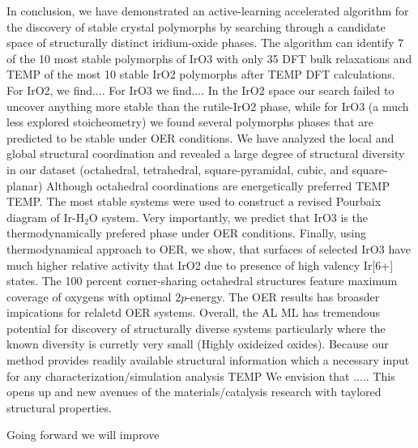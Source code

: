 

%

In conclusion, we have demonstrated an active-learning accelerated algorithm for the discovery of stable crystal polymorphs by searching through a candidate space of structurally distinct iridium-oxide phases.
The algorithm can identify 7 of the 10 most stable polymorphs of IrO3 with only 35 DFT bulk relaxations and TEMP of the most 10 stable IrO2 polymorphs after TEMP DFT calculations.
% 
For IrO2, we find....  For IrO3 we find.... 
In the IrO2 space our search failed to uncover anything more stable than the rutile-IrO2 phase,
while for IrO3 (a much less explored stoicheometry) we found several polymorphs phases that are predicted to be stable under OER conditions.
We have analyzed the local and global structural coordination and revealed a large degree of structural diversity in our dataset (octahedral, tetrahedral, square-pyramidal, cubic, and square-planar)
Although octahedral coordinations are energetically preferred TEMP TEMP.
%
The most stable systems were used to construct a revised Pourbaix diagram of Ir-H$_2$O system.
%
Very importantly, we predict that IrO3 is the thermodynamically prefered phase under OER conditions.
%
Finally, using thermodynamical approach to OER, we show, 
that surfaces of selected IrO3 have much higher relative activity that IrO2 due to presence of high valency Ir[6+] states.
%
The 100 percent corner-sharing octahedral structures feature maximum coverage of oxygens with optimal $2p$-energy.
%
The OER results has broasder impications for relaletd OER systems.
%
Overall, the AL ML has tremendous potential for discovery of structurally diverse systems particularly where the known diversity is curretly very small (Highly oxideized oxides).
%
Because our method provides readily available structural information which a necessary input for any characterization/simulation analysis TEMP We envision that ..... 
%
This opens up and new avenues of the materials/catalysis research with taylored structural properties. 


Going forward we will improve


